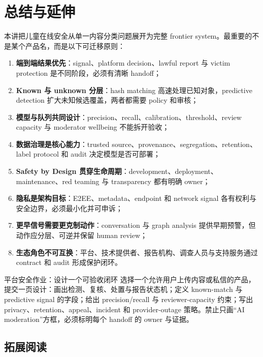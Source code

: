\section{总结与延伸}

本讲把儿童在线安全从单一内容分类问题展开为完整 frontier system。最重要的不是某个产品名，而是以下可迁移原则：

\begin{enumerate}
  \item \textbf{端到端结果优先}：signal、platform decision、lawful report 与 victim protection 是不同阶段，必须有清晰 handoff；
  \item \textbf{Known 与 unknown 分层}：hash matching 高速处理已知对象，predictive detection 扩大未知候选覆盖，两者都需要 policy 和审核；
  \item \textbf{模型与队列共同设计}：precision、recall、calibration、threshold、review capacity 与 moderator wellbeing 不能拆开验收；
  \item \textbf{数据治理是核心能力}：trusted source、provenance、segregation、retention、label protocol 和 audit 决定模型是否可部署；
  \item \textbf{Safety by Design 贯穿生命周期}：development、deployment、maintenance、red teaming 与 transparency 都有明确 owner；
  \item \textbf{隐私是架构目标}：E2EE、metadata、endpoint 和 network signal 各有权利与安全边界，必须最小化并可申诉；
  \item \textbf{更早信号需要更克制动作}：conversation 与 graph analysis 提供早期预警，但动作应分层、可逆并保留 human review；
  \item \textbf{生态角色不可互换}：平台、技术提供者、报告机构、调查人员与支持服务通过 contract 和 audit 形成保护闭环。
\end{enumerate}

\begin{importantbox}{平台安全作业：设计一个可验收闭环}
选择一个允许用户上传内容或私信的产品，提交一页设计：画出检测、复核、处置与报告状态机；定义 known-match 与 predictive signal 的字段；给出 precision/recall 与 reviewer-capacity 约束；写出 privacy、retention、appeal、incident 和 provider-outage 策略。禁止只画“AI moderation”方框，必须标明每个 handoff 的 owner 与证据。
\end{importantbox}

\subsection{拓展阅读}

